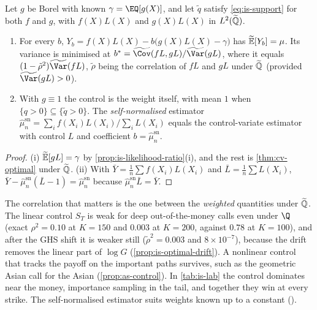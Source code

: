 \begin{proposition}\label{prop:is-control}
Let $g$ be Borel with known $\gamma=\EQ[g(X)]$, and let $\tilde q$ satisfy
\eqref{eq:is-support} for both $f$ and $g$, with $f(X)L(X)$ and $g(X)L(X)$ in $L^2(\widetilde{\mathbb Q})$.
\begin{enumerate}[label=(\roman*)]
  \item For every $b$, $Y_b=f(X)L(X)-b\big(g(X)L(X)-\gamma\big)$ has $\widetilde{\mathbb E}[Y_b]=\mu$. Its
    variance is minimised at $b^*=\widetilde{\Cov}(fL,gL)/\widetilde\Var(gL)$, where it equals
    $(1-\tilde\rho^2)\widetilde\Var(fL)$, $\tilde\rho$ being the correlation of $fL$ and $gL$
    under $\widetilde{\mathbb Q}$ (provided $\widetilde\Var(gL)>0$).
  \item With $g\equiv1$ the control is the weight itself, with mean $1$ when $\{q>0\}\subseteq\{\tilde q>0\}$.
    The \emph{self-normalised} estimator $\hat\mu^{\mathrm{sn}}_n=\sum_if(X_i)L(X_i)/\sum_iL(X_i)$
    equals the control-variate estimator with control $L$ and coefficient
    $b=\hat\mu^{\mathrm{sn}}_n$.
\end{enumerate}
\end{proposition}

\begin{proof}
(i) $\widetilde{\mathbb E}[gL]=\gamma$ by \cref{prop:is-likelihood-ratio}(i), and the rest is
\cref{thm:cv-optimal} under $\widetilde{\mathbb Q}$. (ii) With $\bar Y=\frac1n\sum f(X_i)L(X_i)$ and
$\bar L=\frac1n\sum L(X_i)$, $\bar Y-\hat\mu^{\mathrm{sn}}_n(\bar L-1)=\hat\mu^{\mathrm{sn}}_n$
because $\hat\mu^{\mathrm{sn}}_n\bar L=\bar Y$.
\end{proof}

The correlation that matters is the one between the \emph{weighted} quantities under $\widetilde{\mathbb Q}$.
The linear control $S_T$ is weak for deep out-of-the-money calls even under $\Q$ (exact
$\rho^2=0.10$ at $K=150$ and $0.003$ at $K=200$, against $0.78$ at $K=100$), and after the GHS
shift it is weaker still ($\tilde\rho^2=0.003$ and $8\times10^{-7}$), because the drift removes
the linear part of $\log G$ (\cref{prop:is-optimal-drift}). A
nonlinear control that tracks the payoff on the important paths survives, such as the geometric
Asian call for the Asian (\cref{prop:as-control}). In \cref{tab:is-lab} the control dominates
near the money, importance sampling in the tail, and together they win at every strike. The
self-normalised estimator suits weights known up to a constant ().

